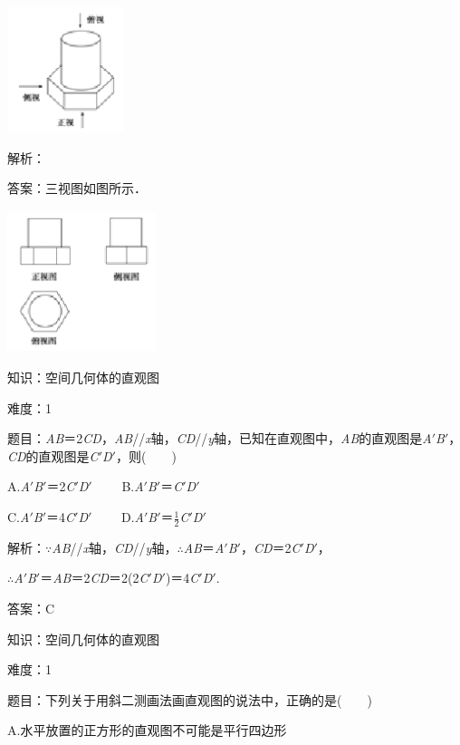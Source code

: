 \documentclass{article} %
\begin{document}
\includegraphics*[width=1.34in, height=1.44in, keepaspectratio=false]{image45}

解析：

答案：三视图如图所示．

\includegraphics*[width=1.72in, height=1.63in, keepaspectratio=false]{image46}



知识：空间几何体的直观图

难度：1

题目：\textit{AB}＝2\textit{CD}，\textit{AB}//\textit{x}轴，\textit{CD}//\textit{y}轴，已知在直观图中，\textit{AB}的直观图是\textit{A}$'$\textit{B}$'$，\textit{CD}的直观图是\textit{C}$'$\textit{D}$'$，则(　　)

A.\textit{A}$'$\textit{B}$'$＝2\textit{C}$'$\textit{D}$'$　　 B.\textit{A}$'$\textit{B}$'$＝\textit{C}$'$\textit{D}$'$

C.\textit{A}$'$\textit{B}$'$＝4\textit{C}$'$\textit{D}$'$　　 D.\textit{A}$'$\textit{B}$'$＝$\frac{1}{2}$\textit{C}$'$\textit{D}$'$

解析：$\mathrm{\because}$\textit{AB}//\textit{x}轴，\textit{CD}//\textit{y}轴，$\mathrm{\therefore}$\textit{AB}＝\textit{A}$'$\textit{B}$'$，\textit{CD}＝2\textit{C}$'$\textit{D}$'$，

$\mathrm{\therefore}$\textit{A}$'$\textit{B}$'$＝\textit{AB}＝2\textit{CD}＝2(2\textit{C}$'$\textit{D}$'$)＝4\textit{C}$'$\textit{D}$'$.

答案：C

知识：空间几何体的直观图

难度：1

题目：下列关于用斜二测画法画直观图的说法中，正确的是(　　)

A.水平放置的正方形的直观图不可能是平行四边形
\end{document}
